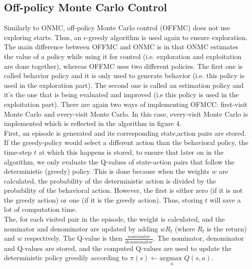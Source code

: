 \documentclass{article}
\begin{document}
\subsection{Off-policy Monte Carlo Control}
Similarly to ONMC, off-policy Monte Carlo control (OFFMC) does not use exploring starts. Thus, an $\epsilon$-greedy algorithm is used again to ensure exploration. The main difference between OFFMC and ONMC is in that ONMC estimates the value of a policy while using it for control (i.e. exploration and exploitation are done together), whereas OFFMC uses two different policies. The first one is called behavior policy and it is only used to generate behavior (i.e. this policy is used in the exploration part). The second one is called an estimation policy and it's the one that is being evaluated and improved (i.e this policy is used in the exploitation part). There are again two ways of implementing OFMCC: first-visit Monte Carlo and every-visit Monte Carlo. In this case, every-visit Monte Carlo is implemented which is reflected in the algorithm in figure 4. \\
First, an episode is generated and its corresponding state,action pairs are stored. If the greedy-policy would select a different action than the behavioral policy, the time-step $t$ at which this happens is stored, to ensure that later on in the algorithm, we only evaluate the Q-values of state-action pairs that follow the deterministic (greedy) policy. This is done because when the weights $w$ are calculated, the probability of the deterministic action is divided by the probability of the behavioral action. However, the first is either zero (if it is not the greedy action) or one (if it is the greedy action). Thus, storing $t$ will save a lot of computation time. \\
The, for each visited pair in the episode, the weight is calculated, and the nominator and denominator are updated by adding $wR_t$ (where $R_t$ is the return) and $w$ respectively. The Q-value is then $\frac{nominator}{denominator}$. The nominator, denominator and Q-values are stored, and the computed Q-values are used to update the deterministic policy greedily according to $\pi(s) \leftarrow \underset{a}{\text{argmax }} Q(s,a)$.
\end{document}
